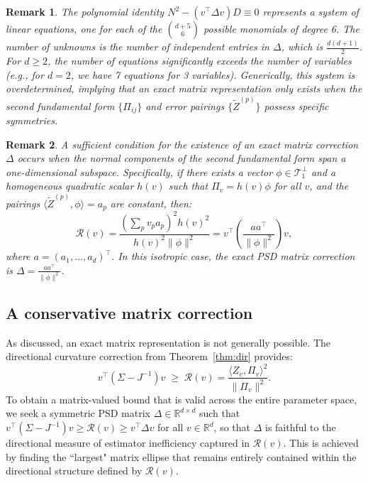 \documentclass[pdflatex,sn-mathphys-num]{sn-jnl}%
\theoremstyle{thmstyleone}%
\theoremstyle{thmstyletwo}%
\newtheorem{remark}{Remark}%
\theoremstyle{thmstylethree}%
\begin{document}
\begin{remark}
The polynomial identity \(N^2 - (v^\top\Delta v)D \equiv 0\) represents a system of linear equations, one for each of the \(\binom{d+5}{6}\) possible monomials of degree 6. The number of unknowns is the number of independent entries in \(\Delta\), which is \(\frac{d(d+1)}{2}\). For \(d \ge 2\), the number of equations significantly exceeds the number of variables (e.g., for \(d=2\), we have 7 equations for 3 variables). Generically, this system is overdetermined, implying that an exact matrix representation only exists when the second fundamental form \(\{\Pi_{ij}\}\) and error pairings \(\{\widetilde Z^{(p)}\}\) possess specific symmetries.
\end{remark}

\begin{remark}
\label{rem:mat}
A sufficient condition for the existence of an exact matrix correction \(\Delta\) occurs when the normal components of the second fundamental form span a one-dimensional subspace. Specifically, if there exists a vector \(\phi \in \mathcal{T}_1^\perp\) and a homogeneous quadratic scalar \(h(v)\) such that \(\Pi_v = h(v)\phi\) for all \(v\), and the pairings \(\langle \widetilde Z^{(p)}, \phi \rangle = a_p\) are constant, then:
\[
\mathcal{R}(v) = \frac{\left(\sum_p v_p a_p\right)^2 h(v)^2}{h(v)^2 \|\phi\|^2} = v^\top \left(\frac{a a^\top}{\|\phi\|^2}\right) v,
\]
where \(a = (a_1, \dots, a_d)^\top\). In this isotropic case, the exact PSD matrix correction is \(\Delta = \frac{a a^\top}{\|\phi\|^2}\).
\end{remark}

\subsection{A conservative matrix correction} 
As discussed, an exact matrix representation is not generally possible. The directional curvature correction from Theorem~\ref{thm:dir} provides:
\[
v^\top(\Sigma-J^{-1})v \;\ge\; \mathcal R(v) = \frac{\langle Z_v,\Pi_v\rangle^2}{\|\Pi_v\|^2}.
\]
To obtain a matrix-valued bound that is valid across the entire parameter space, we seek a symmetric PSD matrix $\Delta \in \mathbb{R}^{d\times d}$ such that $v^\top(\Sigma-J^{-1})v \ge \mathcal{R}(v)\geq v^\top \Delta v$ for all $v \in \mathbb{R}^d$, so that \(\Delta\) is faithful to the directional measure of estimator inefficiency captured in \(\mathcal{R}(v)\). This is achieved by finding the ``largest" matrix ellipse that remains entirely contained within the directional structure defined by \(\mathcal{R}(v)\).
\end{document}
